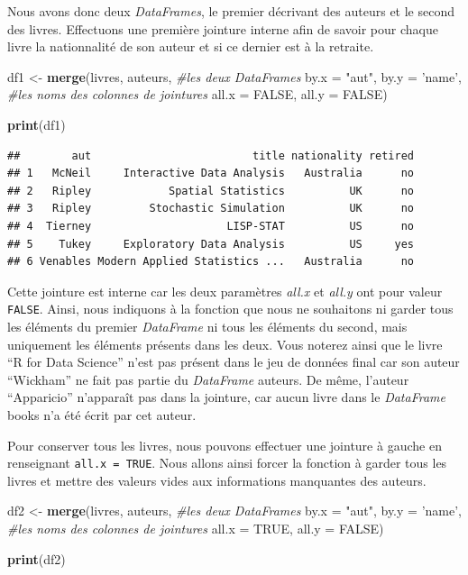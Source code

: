 \documentclass[
  11pt,
  french,
]{book}
\makeatletter
\newenvironment{Shaded}{\begin{snugshade}}{\end{snugshade}}
\newcommand{\CommentTok}[1]{\textcolor[rgb]{0.56,0.35,0.01}{\textit{#1}}}
\newcommand{\DataTypeTok}[1]{\textcolor[rgb]{0.13,0.29,0.53}{#1}}
\newcommand{\KeywordTok}[1]{\textcolor[rgb]{0.13,0.29,0.53}{\textbf{#1}}}
\newcommand{\NormalTok}[1]{#1}
\newcommand{\OtherTok}[1]{\textcolor[rgb]{0.56,0.35,0.01}{#1}}
\newcommand{\StringTok}[1]{\textcolor[rgb]{0.31,0.60,0.02}{#1}}
\newenvironment{kframe}{%
\medskip{}
\setlength{\fboxsep}{.8em}
 \def\at@end@of@kframe{}%
 \ifinner\ifhmode%
  \def\at@end@of@kframe{\end{minipage}}%
  \begin{minipage}{\columnwidth}%
 \fi\fi%
 \def\FrameCommand##1{\hskip\@totalleftmargin \hskip-\fboxsep
 \colorbox{shadecolor}{##1}\hskip-\fboxsep
     \hskip-\linewidth \hskip-\@totalleftmargin \hskip\columnwidth}%
 \MakeFramed {\advance\hsize-\width
   \@totalleftmargin\z@ \linewidth\hsize
   \@setminipage}}%
 {\par\unskip\endMakeFramed%
 \at@end@of@kframe}
\renewenvironment{Shaded}{\begin{kframe}}{\end{kframe}}
\makeatother
\begin{document}
Nous avons donc deux \emph{DataFrames}, le premier décrivant des auteurs et le second des livres. Effectuons une première jointure interne afin de savoir pour chaque livre la nationnalité de son auteur et si ce dernier est à la retraite.

\begin{Shaded}
\begin{Highlighting}[]
\NormalTok{df1 <-}\StringTok{ }\KeywordTok{merge}\NormalTok{(livres, auteurs, }\CommentTok{#les deux DataFrames }
             \DataTypeTok{by.x =} \StringTok{"aut"}\NormalTok{, }\DataTypeTok{by.y =} \StringTok{'name'}\NormalTok{, }\CommentTok{#les noms des colonnes de jointures}
             \DataTypeTok{all.x =} \OtherTok{FALSE}\NormalTok{, }\DataTypeTok{all.y =} \OtherTok{FALSE}\NormalTok{)}

\KeywordTok{print}\NormalTok{(df1)}
\end{Highlighting}
\end{Shaded}

\begin{verbatim}
##        aut                         title nationality retired
## 1   McNeil     Interactive Data Analysis   Australia      no
## 2   Ripley            Spatial Statistics          UK      no
## 3   Ripley         Stochastic Simulation          UK      no
## 4  Tierney                     LISP-STAT          US      no
## 5    Tukey     Exploratory Data Analysis          US     yes
## 6 Venables Modern Applied Statistics ...   Australia      no
\end{verbatim}

Cette jointure est interne car les deux paramètres \emph{all.x} et \emph{all.y} ont pour valeur \texttt{FALSE}. Ainsi, nous indiquons à la fonction que nous ne souhaitons ni garder tous les éléments du premier \emph{DataFrame} ni tous les éléments du second, mais uniquement les éléments présents dans les deux. Vous noterez ainsi que le livre ``R for Data Science'' n'est pas présent dans le jeu de données final car son auteur ``Wickham'' ne fait pas partie du \emph{DataFrame} auteurs. De même, l'auteur ``Apparicio'' n'apparaît pas dans la jointure, car aucun livre dans le \emph{DataFrame} books n'a été écrit par cet auteur.

Pour conserver tous les livres, nous pouvons effectuer une jointure à gauche en renseignant \texttt{all.x\ =\ TRUE}. Nous allons ainsi forcer la fonction à garder tous les livres et mettre des valeurs vides aux informations manquantes des auteurs.

\begin{Shaded}
\begin{Highlighting}[]
\NormalTok{df2 <-}\StringTok{ }\KeywordTok{merge}\NormalTok{(livres, auteurs, }\CommentTok{#les deux DataFrames }
             \DataTypeTok{by.x =} \StringTok{"aut"}\NormalTok{, }\DataTypeTok{by.y =} \StringTok{'name'}\NormalTok{, }\CommentTok{#les noms des colonnes de jointures}
             \DataTypeTok{all.x =} \OtherTok{TRUE}\NormalTok{, }\DataTypeTok{all.y =} \OtherTok{FALSE}\NormalTok{)}

\KeywordTok{print}\NormalTok{(df2)}
\end{Highlighting}
\end{Shaded}
\end{document}

